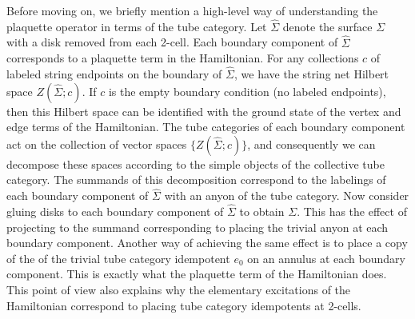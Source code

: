Before moving on, we briefly mention a 
high-level way of understanding the plaquette operator in terms of the tube category.
Let $\widehat\Sigma$ denote the surface $\Sigma$ with a disk removed from each 2-cell.
Each boundary component of $\widehat\Sigma$ corresponds to a plaquette term in the Hamiltonian. 
For any collections $c$ of labeled string endpoints on the boundary of $\widehat\Sigma$, we have
the string net Hilbert space $Z(\widehat\Sigma; c)$.
If $c$ is the empty boundary condition (no labeled endpoints), then this Hilbert space can be identified with
the ground state of the vertex and edge terms of the Hamiltonian.
The tube categories of each boundary component act on the collection of vector spaces $\{Z(\widehat\Sigma; c)\}$,
and consequently we can decompose these spaces according to the simple objects of the collective tube category.
The summands of this decomposition correspond to the labelings of each boundary component of $\widehat\Sigma$ with an
anyon of the tube category.
Now consider gluing disks to each boundary component of $\widehat\Sigma$ to obtain $\Sigma$.
This has the effect of projecting to the summand corresponding to placing the trivial anyon at each boundary component.
Another way of achieving the same effect is to place a copy of the of the trivial tube category idempotent $e_0$
on an annulus at each boundary component.
This is exactly what the plaquette term of the Hamiltonian does.
This point of view also explains why the elementary excitations of the Hamiltonian
correspond to placing tube category idempotents at 2-cells.


